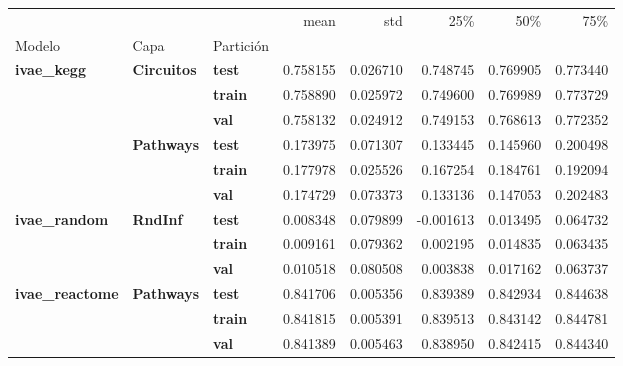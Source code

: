 \begin{tabular}{lllrrrrr}
\toprule
 &  &  & mean & std & 25\% & 50\% & 75\% \\
Modelo & Capa & Partición &  &  &  &  &  \\
\midrule
\multirow[t]{6}{*}{\textbf{ivae\_kegg}} & \multirow[t]{3}{*}{\textbf{Circuitos}} & \textbf{test} & 0.758155 & 0.026710 & 0.748745 & 0.769905 & 0.773440 \\
\textbf{} & \textbf{} & \textbf{train} & 0.758890 & 0.025972 & 0.749600 & 0.769989 & 0.773729 \\
\textbf{} & \textbf{} & \textbf{val} & 0.758132 & 0.024912 & 0.749153 & 0.768613 & 0.772352 \\
\cline{2-8}
\textbf{} & \multirow[t]{3}{*}{\textbf{Pathways}} & \textbf{test} & 0.173975 & 0.071307 & 0.133445 & 0.145960 & 0.200498 \\
\textbf{} & \textbf{} & \textbf{train} & 0.177978 & 0.025526 & 0.167254 & 0.184761 & 0.192094 \\
\textbf{} & \textbf{} & \textbf{val} & 0.174729 & 0.073373 & 0.133136 & 0.147053 & 0.202483 \\
\cline{1-8} \cline{2-8}
\multirow[t]{3}{*}{\textbf{ivae\_random}} & \multirow[t]{3}{*}{\textbf{RndInf}} & \textbf{test} & 0.008348 & 0.079899 & -0.001613 & 0.013495 & 0.064732 \\
\textbf{} & \textbf{} & \textbf{train} & 0.009161 & 0.079362 & 0.002195 & 0.014835 & 0.063435 \\
\textbf{} & \textbf{} & \textbf{val} & 0.010518 & 0.080508 & 0.003838 & 0.017162 & 0.063737 \\
\cline{1-8} \cline{2-8}
\multirow[t]{3}{*}{\textbf{ivae\_reactome}} & \multirow[t]{3}{*}{\textbf{Pathways}} & \textbf{test} & 0.841706 & 0.005356 & 0.839389 & 0.842934 & 0.844638 \\
\textbf{} & \textbf{} & \textbf{train} & 0.841815 & 0.005391 & 0.839513 & 0.843142 & 0.844781 \\
\textbf{} & \textbf{} & \textbf{val} & 0.841389 & 0.005463 & 0.838950 & 0.842415 & 0.844340 \\
\cline{1-8} \cline{2-8}
\bottomrule
\end{tabular}
